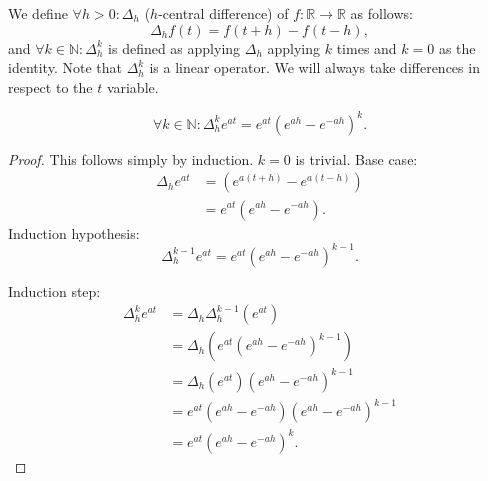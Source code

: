 \documentclass[a4paper,12pt]{article}
\begin{document}
\begin{definition}[$\Delta^{k}_{h}$]
    We define $\forall h>0: \Delta_{h}$ ($h$-central difference) of $f:\mathbb{R}\rightarrow \mathbb{R}$ as follows:
    \begin{equation}
        \Delta_{h} f(t) = f(t+h)- f(t-h),
    \end{equation}
    and $\forall k \in \mathbb{N}:\Delta^{k}_{h}$ is defined as applying $\Delta_{h}$ applying $k$ times and
    $k=0$ as the identity. Note that $\Delta^{k}_{h}$ is a linear operator. We will always take
    differences in respect to the $t$ variable.
\end{definition}

\begin{lemma}[$\Delta^{k}_{h} e^{at}$]
    \begin{equation}
        \forall k \in \mathbb{N}: \Delta^{k}_{h} e^{at} =  e^{at} \left( e^{ah} - e^{-ah} \right)^{k}.
    \end{equation}
\end{lemma}

\begin{proof}
    This follows simply by induction. $k=0$ is trivial.
    Base case:
    \begin{align}
        \Delta_{h} e^{at} & =\left( e^{a(t+h)} - e^{a(t-h)} \right) \\
                          & =e^{at}\left( e^{ah} - e^{-ah} \right)
        .
    \end{align}
    Induction hypothesis:
    \begin{equation}
        \Delta^{k-1}_{h} e^{at} = e^{at} \left( e^{ah} - e^{-ah} \right)^{k-1}.
    \end{equation}

    Induction step:
    \begin{align}
        \Delta^{k}_{h} e^{at} & = \Delta_{h} \Delta^{k-1}_{h} (e^{at})                                        \\
                              & = \Delta_{h} \left( e^{at} \left( e^{ah} - e^{-ah} \right)^{k-1} \right)      \\
                              & = \Delta_{h} \left( e^{at}\right) \left( e^{ah} - e^{-ah} \right)^{k-1}       \\
                              & = e^{at}\left( e^{ah} - e^{-ah} \right) \left( e^{ah} - e^{-ah} \right)^{k-1} \\
                              & =  e^{at} \left( e^{ah} - e^{-ah} \right)^{k}.
    \end{align}
\end{proof}
\end{document}
